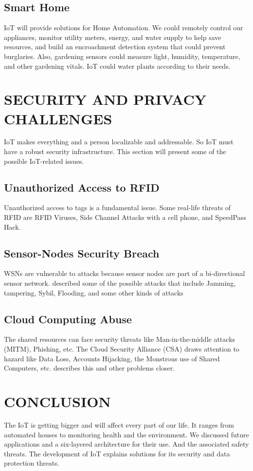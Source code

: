 \documentclass[twoside,twocolumn]{article}
\begin{document}
    \subsection{Smart Home}
        IoT will provide solutions for Home Automation. We could remotely control our appliances, monitor utility meters, energy, and water supply to help save resources, and build an encroachment detection system that could prevent burglaries. Also, gardening sensors could measure light, humidity, temperature, and other gardening vitals. IoT could water plants according to their needs.

\section{SECURITY AND PRIVACY CHALLENGES}

    IoT makes everything and a person localizable and addressable. So IoT must have a robust security infrastructure. This section will present some of the possible IoT-related issues.
    \subsection{Unauthorized Access to RFID}
        Unauthorized access to tags is a fundamental issue. Some real-life threats of RFID are RFID Viruses, Side Channel Attacks with a cell phone, and SpeedPass Hack.
    \subsection{ Sensor-Nodes Security Breach}
        WSNs are vulnerable to attacks because sensor nodes are part of a bi-directional sensor network. \cite{SecurityIssuesWireless} described some of the possible attacks that include Jamming, tampering, Sybil, Flooding, and some other kinds of attacks
    \subsection{Cloud Computing Abuse}
        The shared resources can face security threats like Man-in-the-middle attacks (MITM), Phishing, etc. The Cloud Security Alliance (CSA) draws attention to hazard like Data Loss, Accounts Hijacking, the Monstrous use of Shared Computers, etc. \cite{SecurityCloudComputing} describes this and other problems closer.
        
\section{CONCLUSION}
    The IoT is getting bigger and will affect every part of our life. It ranges from automated houses to monitoring health and the environment. We discussed future applications and a six-layered architecture for their use. And the associated safety threats. The development of IoT explains solutions for its security and data protection threats.

    
    {\footnotesize
    }
\end{document}
